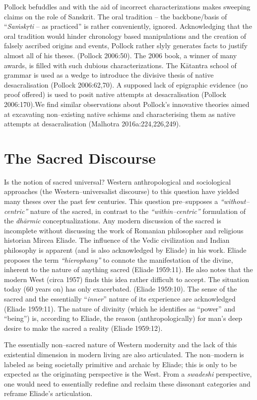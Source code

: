 Pollock befuddles and with the aid of incorrect characterizations makes sweeping claims on the role of Sanskrit. The oral tradition – the backbone/basis of “\textit{Saṁskṛti} – as practiced” is rather conveniently, ignored. Acknowledging that the oral tradition would hinder chronology based manipulations and the creation of falsely ascribed origins and events, Pollock rather slyly generates facts to justify almost all of his theses. (Pollock 2006:50). The 2006 book, a winner of many awards, is filled with such dubious characterizations. The Kātantra school of grammar is used as a wedge to introduce the divisive thesis of native desacralisation (Pollock 2006:62,70). A supposed lack of epigraphic evidence (no proof offered) is used to posit native attempts at desacralisation (Pollock 2006:170).We find similar observations about Pollock's innovative theories aimed at excavating non–existing native schisms and characterising them as native attempts at desacralisation (Malhotra 2016a:224,226,249).


\section*{The Sacred Discourse}

Is the notion of sacred universal? Western anthropological and sociological approaches (the Western–universalist discourse) to this question have yielded many theses over the past few centuries. This question pre–supposes a \textit{“without–centric”} nature of the sacred, in contrast to the \textit{“within–centric”} formulation of the \textit{dhārmic} conceptualizations. Any modern discussion of the sacred is incomplete without discussing the work of Romanian philosopher and religious historian Mircea Eliade. The influence of the Vedic civilization and Indian philosophy is apparent (and is also acknowledged by Eliade) in his work. Eliade proposes the term \textit{“hierophany”} to connote the manifestation of the divine, inherent to the nature of anything sacred (Eliade 1959:11). He also notes that the modern West (circa 1957) finds this idea rather difficult to accept. The situation today (60 years on) has only exacerbated. (Eliade 1959:10). The sense of the sacred and the essentially “\textit{inner}” nature of its experience are acknowledged (Eliade 1959:11). The nature of divinity (which he identifies as “power” and “being”) is, according to Eliade, the reason (anthropologically) for man's deep desire to make the sacred a reality (Eliade 1959:12).

The essentially non–sacred nature of Western modernity and the lack of this existential dimension in modern living are also articulated. The non–modern is labeled as being societally primitive and archaic by Eliade; this is only to be expected as the originating perspective is the West. From a \textit{swadeshi} perspective, one would need to essentially redefine and reclaim these dissonant categories and reframe Eliade's articulation.

